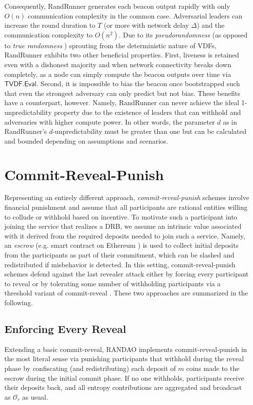 \documentclass[conference]{IEEEtran}
\theoremstyle{definition}
\theoremstyle{remark}
\begin{document}
Consequently, RandRunner generates each beacon output rapidly with only $O(n)$ communication complexity in the common case. Adversarial leaders can increase the round duration to $T$ (or more with network delay $\Delta$) and the communication complexity to $O(n^2)$. Due to its \textit{pseudorandomness} (as opposed to \textit{true randomness} \cite{cascudomt, das2021spurt}) sprouting from the deterministic nature of VDFs, RandRunner exhibits two other beneficial properties. First, liveness is retained even with a dishonest majority and when network connectivity breaks down completely, as a node can simply compute the beacon outputs over time via $\mathsf{TVDF.Eval}$. Second, it is impossible to bias the beacon once bootstrapped such that even the strongest adversary can only predict but not bias. These benefits have a counterpart, however. Namely, RandRunner can never achieve the ideal 1-unpredictability property due to the existence of leaders that can withhold and adversaries with higher compute power. In other words, the parameter $d$ as in RandRunner's $d$-unpredictability must be greater than one but can be calculated and bounded \cite{schindler2021randrunner} depending on assumptions and scenarios.

\section{Commit-Reveal-Punish}
\label{section:commit-reveal-punish}
Representing an entirely different approach, \textit{commit-reveal-punish} schemes involve financial punishment and assume that all participants are rational entities willing to collude or withhold based on incentive. To motivate such a participant into joining the service that realizes a DRB, we assume an intrinsic value associated with it derived from the required deposits needed to join such a service. Namely, an \textit{escrow} (e.g. smart contract on Ethereum \cite{wood2014ethereum}) is used to collect initial deposits from the participants as part of their commitment, which can be slashed and redistributed if misbehavior is detected. In this setting, commit-reveal-punish schemes defend against the last revealer attack either by forcing every participant to reveal \cite{youcai2017randao, andrychowicz2014secure, bentov2014use} or by tolerating some number of withholding participants via a threshold variant of commit-reveal \cite{david2020economically}. These two approaches are summarized in the following.

\subsection{Enforcing Every Reveal}
Extending a basic commit-reveal, RANDAO \cite{youcai2017randao} implements commit-reveal-punish in the most literal sense via punishing participants that withhold during the reveal phase by confiscating (and redistributing) each deposit of $m$ coins made to the escrow during the initial commit phase. If no one withholds, participants receive their deposits back, and all entropy contributions are aggregated and broadcast as $\mathcal{O}_r$ as usual.
\end{document}
